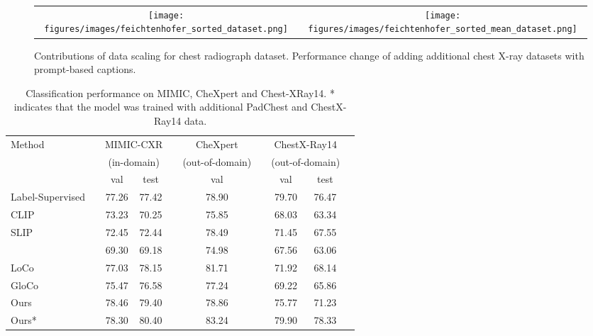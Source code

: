 \documentclass[runningheads]{llncs}
\begin{document}
\begin{figure*}[t]
    \centering
    \begin{tabular}{cc}
       \texttt{[image: figures/images/feichtenhofer\_sorted\_dataset.png]}  &  \texttt{[image: figures/images/feichtenhofer\_sorted\_mean\_dataset.png]}
    \end{tabular}
    
    \caption{Contributions of data scaling for chest radiograph dataset.  Performance change of adding additional chest X-ray datasets with prompt-based captions.}
    \label{fig:data}
\end{figure*} \begin{table}[h]
    \centering
    \begin{tabular}{lccccccccc}
    \toprule
    \multirow{3}{*}{Method} & & \multicolumn{2}{c}{MIMIC-CXR }  && \multicolumn{1}{c}{CheXpert } && \multicolumn{2}{c}{ChestX-Ray14 } \\
    & &  \multicolumn{2}{c}{(in-domain)} &&  \multicolumn{1}{c}{(out-of-domain)} &&  \multicolumn{2}{c}{(out-of-domain)} \\ 
    & &  val & test &&   val &&  val & test \\ 
    
    \midrule
    Label-Supervised & & 77.26 & 77.42 & & 78.90 & & 79.70 &  76.47  \\
    \midrule
    CLIP                          & & 73.23 & 70.25 & & 75.85 & & 68.03 & 63.34  \\
    SLIP                          & & 72.45 & 72.44 & & 78.49 & & 71.45 & 67.55  \\
    \midrule
                    & & 69.30 & 69.18 & & 74.98 & & 67.56 & 63.06 \\
    LoCo                          & & 77.03 & 78.15 & & 81.71 & & 71.92 & 68.14  \\
    GloCo                         & & 75.47 & 76.58 & & 77.24 & & 69.22 & 65.86  \\
    Ours                          & & 78.46 & 79.40 & & 78.86 & & 75.77 & 71.23  \\
    \midrule
    Ours*                         & & 78.30 & 80.40 & & 83.24 & & 79.90 & 78.33  \\
     \bottomrule
    \end{tabular}
    \caption{Classification performance on MIMIC, CheXpert and Chest-XRay14. * indicates that the model was trained with additional PadChest and ChestX-Ray14 data.}
    \label{tab:final}
\end{table}
\end{document}
